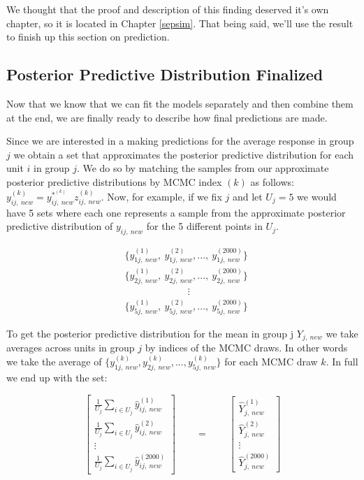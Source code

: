 \documentclass[12pt,twoside]{reedthesis}
\begin{document}
We thought that the proof and description of this finding deserved it's own chapter, so it is located in Chapter \ref{sepsim}. That being said, we'll use the result to finish up this section on prediction.

\hypertarget{wrapone}{%
\subsection{Posterior Predictive Distribution Finalized}\label{wrapone}}

Now that we know that we can fit the models separately and then combine them at the end, we are finally ready to describe how final predictions are made.

Since we are interested in a making predictions for the average response in group \(j\) we obtain a set that approximates the posterior predictive distribution for each unit \(i\) in group \(j\). We do so by matching the samples from our approximate posterior predictive distributions by MCMC index \((k)\) as follows: \(y^{(k)}_{ij,\ new} = y^{*^{(k)}}_{ij, \ new}z^{(k)}_{ij, \ new}\). Now, for example, if we fix \(j\) and let \(U_j = 5\) we would have 5 sets where each one represents a sample from the approximate posterior predictive distribution of \(y_{ij, \ new}\) for the 5 different points in \(U_j\).

\[
\begin{aligned}
&\Big\{y_{1j , \ new}^{(1)}, \ y_{1j, \ new}^{(2)}, ..., \ y_{1j, \ new}^{(2000)}\Big\} \\
&\Big\{y_{2j , \ new}^{(1)}, \ y_{2j, \ new}^{(2)}, ...,  \ y_{2j, \ new}^{(2000)}\Big\} \\
& \qquad \qquad \qquad \ \   \vdots \\
&\Big\{y_{5j , \ new}^{(1)}, \ y_{5j, \ new}^{(2)}, ..., \ y_{5j, \ new}^{(2000)}\Big\}
\end{aligned}
\]

To get the posterior predictive distribution for the mean in group j \(Y_{j, \ new}\) we take averages across units in group \(j\) by indices of the MCMC draws. In other words we take the average of \(\Big\{y_{1j, \ new}^{(k)}, y_{2j, \ new}^{(k)}, ... , y_{5j, \ new}^{(k)}\Big\}\) for each MCMC draw \(k\). In full we end up with the set:

\[
\begin{bmatrix}
\frac{1}{U_j} \sum_{i \in U_j}\hat{y}_{ij, \ new}^{(1)} \\
\frac{1}{U_j} \sum_{i \in U_j}\hat{y}_{ij, \ new}^{(2)} \\
\vdots \\
\frac{1}{U_j} \sum_{i \in U_j}\hat{y}_{ij, \ new}^{(2000)}
\end{bmatrix} \qquad = \qquad 
\begin{bmatrix}
\hat{Y}_{j, \ new}^{(1)} \\
\hat{Y}_{j, \ new}^{(2)} \\
\vdots \\
\hat{Y}_{j, \ new}^{(2000)}
\end{bmatrix}
\]
\end{document}

